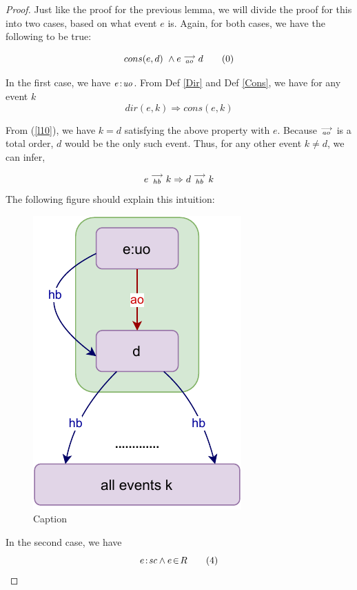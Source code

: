 \begin{proof}
    
    Just like the proof for the previous lemma, we will divide the proof for this into two cases, based on what event $e$ is. Again, for both cases, we have the following to be true:
    
    \[
        cons(e,d) \ \wedge e\stackrel{\longrightarrow}{_{ao}}d
        \tag{0}
        \label{l20}
    \]

   In the first case, we have $e\!:\!\textit{uo}$. From Def \ref{Dir} and Def \ref{Cons}, we have for any event $k$
   \[
        dir(e,k) \Rightarrow cons(e,k) 
   \]
   
   From (\ref{l10}), we have $k=d$ satisfying the above property with $e$. 
   Because $\stackrel{\longrightarrow}{_{ao}}$ is a total order, $d$ would be the only such event. 
   Thus, for any other event $k \neq d$, we can infer,
   
   \[
        e\stackrel{\longrightarrow}{_{hb}}k \Rightarrow d\stackrel{\longrightarrow}{_{hb}}k
   \]
   The following figure should explain this intuition:  
    
    \begin{figure}[H]
        \centering
        \includegraphics[scale=0.7]{5.InstructionReordering/3.Lemmas/lemma_proof2_case1.pdf}
        \caption{Caption}
        \label{fig:my_label}
    \end{figure}
    
    In the second case, we have 
    \[
        e\!:\!\textit{sc} \wedge e\!\in\!R
        \tag{4}
        \label{l24}
    \]
    

\end{proof}
